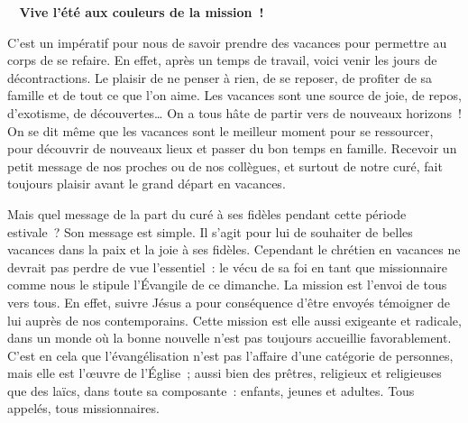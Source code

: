  \begin{center}
 \textbf{
\og 
Vive l’été aux couleurs de la mission !
 \fg{}
 }
 \end{center}

C’est un impératif pour nous de savoir prendre des vacances pour permettre au corps de se refaire. En effet, après un temps de travail, voici venir les jours de décontractions. Le plaisir de ne penser à rien, de se reposer, de profiter de sa famille et de tout ce que l’on aime. Les vacances sont une source de joie, de repos, d’exotisme, de découvertes\dots{} On a tous hâte de partir vers de nouveaux horizons ! On se dit même que les vacances sont le meilleur moment pour se ressourcer, pour découvrir de nouveaux lieux et passer du bon temps en famille. Recevoir un petit message de nos proches ou de nos collègues, et surtout de notre curé, fait toujours plaisir avant le grand départ en vacances.

Mais quel message de la part du curé à ses fidèles pendant cette période estivale ? Son message est simple. Il s’agit pour lui de souhaiter de belles vacances dans la paix et la joie à ses fidèles.
Cependant le chrétien en vacances ne devrait pas perdre de vue l’essentiel : le vécu de sa foi en tant que missionnaire comme nous le stipule l’Évangile de ce dimanche. La mission est l’envoi de tous vers tous. En effet, suivre Jésus a pour conséquence d’être envoyés témoigner de lui auprès de nos contemporains.
Cette mission est elle aussi exigeante et radicale, dans un monde où la bonne nouvelle n’est pas toujours accueillie favorablement. C’est en cela que l’évangélisation n’est pas l’affaire d’une catégorie de personnes, mais elle est l’œuvre de l’Église ; aussi bien des prêtres, religieux et religieuses que des laïcs, dans toute sa composante : enfants, jeunes et adultes.
Tous appelés, tous missionnaires.

